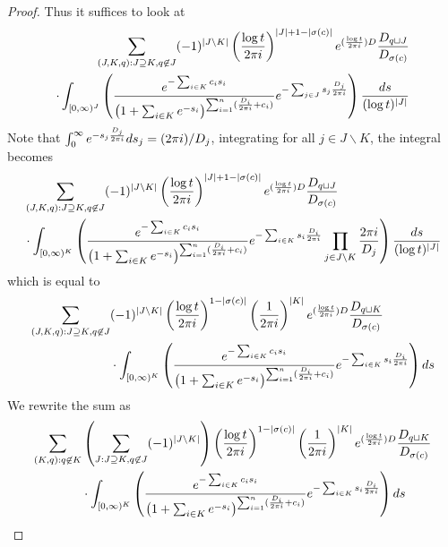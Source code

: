 \documentclass[11pt,reqno]{amsart}
\theoremstyle{definition}
\numberwithin{equation}{section}
\begin{document}
\begin{proof}
	\smallskip


Thus it suffices to look at 
\begin{align*}
	\sum_{(J,K,q):J\supseteq K,q\not\in J}(-1)^{|J\backslash K|}\left(\frac{\log t}{2\pi{\rm i}}\right)^{|J|+1-|\sigma(c)|}e^{(\frac{\log t}{2\pi {\rm i}}) D}\frac{D_{q\sqcup J}}{D_{\sigma(c)}}\\
	\cdot\int_{[0,\infty)^J}\left(\frac{e^{-\sum_{i\in K}c_is_i}}{\left(1+\sum_{i\in K}e^{-s_i}\right)^{\sum_{i=1}^n(\frac{D_i}{2\pi{\rm i}}+c_i)}}e^{-\sum_{j\in J}s_j \frac{D_j}{2\pi{\rm i}}}\right)\frac{ds}{(\log t)^{|J|}}
\end{align*}
Note that $\int_{0}^{\infty}e^{-s_j \frac{D_j}{2\pi{\rm i}}}ds_j=(2\pi{\rm i})/D_j$, integrating for all $j\in J\backslash K$, the integral becomes
\begin{align*}
	&\sum_{(J,K,q):J\supseteq K,q\not\in J}(-1)^{|J\backslash K|}\left(\frac{\log t}{2\pi{\rm i}}\right)^{|J|+1-|\sigma(c)|}e^{(\frac{\log t}{2\pi {\rm i}}) D}\frac{D_{q\sqcup J}}{D_{\sigma(c)}}\\
	&\cdot\int_{[0,\infty)^K}\left(\frac{e^{-\sum_{i\in K}c_is_i}}{\left(1+\sum_{i\in K}e^{-s_i}\right)^{\sum_{i=1}^n(\frac{D_i}{2\pi{\rm i}}+c_i)}}e^{-\sum_{i\in K}s_i \frac{D_i}{2\pi{\rm i}}}\prod_{j\in J\backslash K}\frac{2\pi {\rm i}}{D_j}\right)\frac{ds}{(\log t)^{|J|}}
\end{align*}
which is equal to
\begin{align*}
	\sum_{(J,K,q):J\supseteq K,q\not\in J}&(-1)^{|J\backslash K|}\left(\frac{\log t}{2\pi{\rm i}}\right)^{1-|\sigma(c)|}\left(\frac{1}{2\pi {\rm i}}\right)^{|K|}e^{(\frac{\log t}{2\pi {\rm i}}) D}\frac{D_{q\sqcup K}}{D_{\sigma(c)}}\\
	&\cdot\int_{[0,\infty)^K}\left(\frac{e^{-\sum_{i\in K}c_is_i}}{\left(1+\sum_{i\in K}e^{-s_i}\right)^{\sum_{i=1}^n(\frac{D_i}{2\pi{\rm i}}+c_i)}}e^{-\sum_{i\in K}s_i \frac{D_i}{2\pi{\rm i}}}\right)ds
\end{align*}
We rewrite the sum as
\begin{align*}
	\sum_{(K,q):q\not\in K}&\left(\sum_{J:J\supseteq K,q\not\in J}(-1)^{|J\backslash K|}\right)\left(\frac{\log t}{2\pi{\rm i}}\right)^{1-|\sigma(c)|}\left(\frac{1}{2\pi {\rm i}}\right)^{|K|}e^{(\frac{\log t}{2\pi {\rm i}}) D}\frac{D_{q\sqcup K}}{D_{\sigma(c)}}\\
	&\cdot\int_{[0,\infty)^K}\left(\frac{e^{-\sum_{i\in K}c_is_i}}{\left(1+\sum_{i\in K}e^{-s_i}\right)^{\sum_{i=1}^n(\frac{D_i}{2\pi{\rm i}}+c_i)}}e^{-\sum_{i\in K}s_i \frac{D_i}{2\pi{\rm i}}}\right)ds
\end{align*}


\end{proof}
\end{document}
